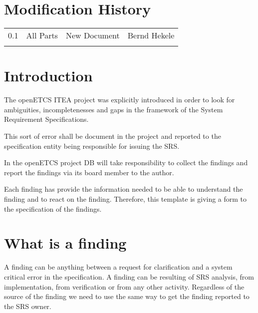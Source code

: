 \documentclass{template/openetcs_article}
\begin{document}
\section*{Modification History}
\begin{supertabular}{| m{1.2cm} | m{1.2cm} | m{6.6cm} | m{4cm} |}
0.1 & All Parts & New Document & Bernd Hekele\\
 & & & \\\hline
\end{supertabular}


\tableofcontents
\listoffiguresandtables
\newpage





\section{Introduction}
The openETCS ITEA project was explicitly introduced in order to look for ambiguities, incompletenesses and gaps in the framework  of the System Requirement Specifications. 

This sort of error shall be document in the project and reported to the specification entity being responsible for issuing the SRS.

In the openETCS project DB will take responsibility to collect the findings and report the findings via its board member to the author. 

Each finding has provide the information needed to be able to understand the finding and to react on the finding. Therefore, this template is giving a form to the specification of the findings.

\section{What is a finding}
A finding can be anything between a request for clarification and a system critical error in the specification. A finding can be resulting of SRS analysis, from implementation, from verification or from any other activity. Regardless of the source of the finding we need to use the same way to get the finding reported to the SRS owner.
\end{document}

